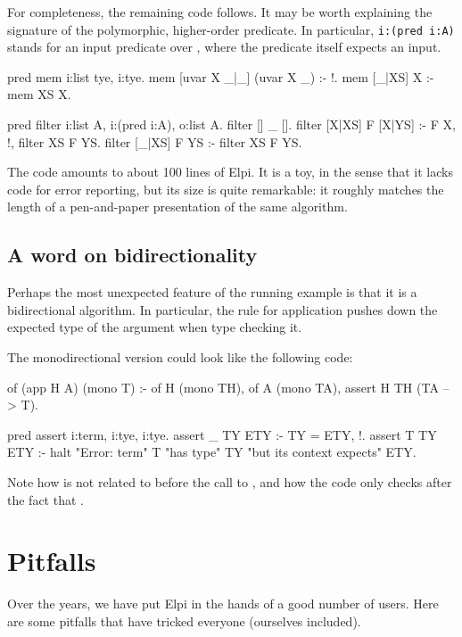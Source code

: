 \documentclass[a4paper, 11pt]{book}
\begin{document}
For completeness, the remaining code follows. It may be worth explaining the
signature of the polymorphic, higher-order  predicate. In
particular, \texttt{i:(pred i:A)} stands for an input predicate over
, where the predicate itself expects an input.

\begin{elpicode}
pred mem i:list tye, i:tye.
mem [uvar X _|_] (uvar X _) :- !.
mem [_|XS] X :- mem XS X.
 
pred filter i:list A, i:(pred i:A), o:list A.
filter [] _ [].
filter [X|XS] F [X|YS] :- F X, !, filter XS F YS.
filter [_|XS] F YS :- filter XS F YS.
\end{elpicode}

The code amounts to about 100 lines of Elpi. It is a toy, in the sense that
it lacks code for error reporting, but its size is quite remarkable: it
roughly matches the length of a pen-and-paper presentation of the same
algorithm.

\subsection{A word on bidirectionality}

Perhaps the most unexpected feature of the running example is that it is a
bidirectional algorithm. In particular, the rule for application pushes down
the expected type of the argument when type checking it.

The monodirectional version could look like the following code:

\begin{elpicode}
of (app H A) (mono T) :-
  of H (mono TH),
  of A (mono TA),
  assert H TH (TA --> T).

pred assert i:term, i:tye, i:tye.
assert _ TY ETY :- TY = ETY, !.
assert T TY ETY :-
  halt "Error: term" T "has type" TY "but its context expects" ETY.
\end{elpicode}

Note how  is not related to  before the call to
, and how the code only checks after the fact that
.

\section{Pitfalls}


Over the years, we have put Elpi in the hands of a good number of users. Here
are some pitfalls that have tricked everyone (ourselves included).
\end{document}
